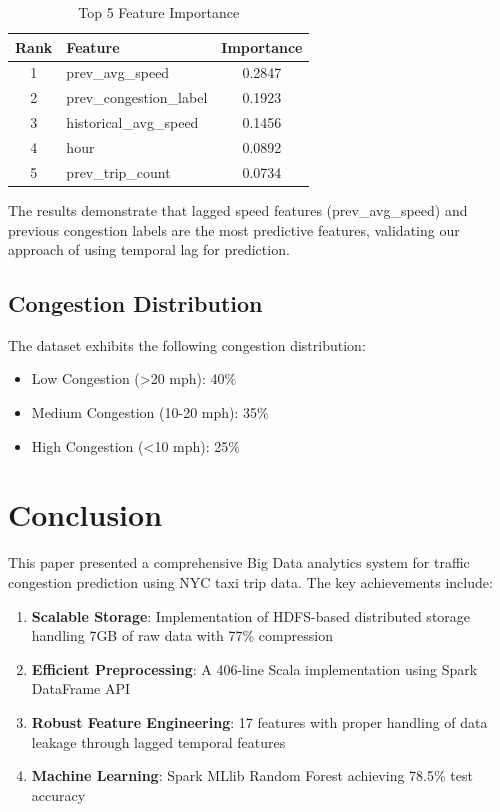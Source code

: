\documentclass[conference]{IEEEtran}
\begin{document}
\begin{table}[htbp]
\caption{Top 5 Feature Importance}
\begin{center}
\begin{tabular}{|c|l|c|}
\hline
\textbf{Rank} & \textbf{Feature} & \textbf{Importance} \\
\hline
1 & prev\_avg\_speed & 0.2847 \\
2 & prev\_congestion\_label & 0.1923 \\
3 & historical\_avg\_speed & 0.1456 \\
4 & hour & 0.0892 \\
5 & prev\_trip\_count & 0.0734 \\
\hline
\end{tabular}
\label{tab:importance}
\end{center}
\end{table}

The results demonstrate that lagged speed features (prev\_avg\_speed) and previous congestion labels are the most predictive features, validating our approach of using temporal lag for prediction.

\subsection{Congestion Distribution}

The dataset exhibits the following congestion distribution:
\begin{itemize}
    \item Low Congestion (>20 mph): 40\%
    \item Medium Congestion (10-20 mph): 35\%
    \item High Congestion (<10 mph): 25\%
\end{itemize}

\section{Conclusion}

This paper presented a comprehensive Big Data analytics system for traffic congestion prediction using NYC taxi trip data. The key achievements include:

\begin{enumerate}
    \item \textbf{Scalable Storage}: Implementation of HDFS-based distributed storage handling 7GB of raw data with 77\% compression
    \item \textbf{Efficient Preprocessing}: A 406-line Scala implementation using Spark DataFrame API
    \item \textbf{Robust Feature Engineering}: 17 features with proper handling of data leakage through lagged temporal features
    \item \textbf{Machine Learning}: Spark MLlib Random Forest achieving 78.5\% test accuracy
\end{enumerate}
\end{document}

